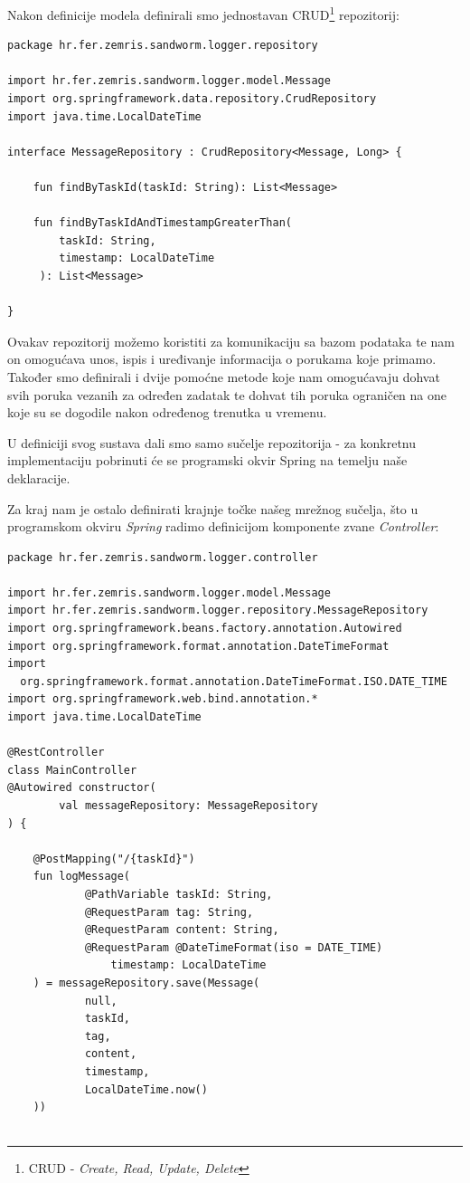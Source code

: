 \documentclass[times, utf8, zavrsni]{fer}
\begin{document}
{Nakon definicije modela definirali smo jednostavan CRUD{\footnote{CRUD - {\textit{Create, Read, Update, Delete}}}} repozitorij:

\begin{lstlisting}
package hr.fer.zemris.sandworm.logger.repository

import hr.fer.zemris.sandworm.logger.model.Message
import org.springframework.data.repository.CrudRepository
import java.time.LocalDateTime

interface MessageRepository : CrudRepository<Message, Long> {

    fun findByTaskId(taskId: String): List<Message>

    fun findByTaskIdAndTimestampGreaterThan(
	 	taskId: String,
		timestamp: LocalDateTime
	 ): List<Message>

}
\end{lstlisting}

Ovakav repozitorij možemo koristiti za komunikaciju sa bazom podataka te nam on omogućava unos, ispis i uređivanje informacija o porukama koje primamo. Također smo definirali i dvije pomoćne metode koje nam omogućavaju dohvat svih poruka vezanih za određen zadatak te dohvat tih poruka ograničen na one koje su se dogodile nakon određenog trenutka u vremenu.

U definiciji svog sustava dali smo samo sučelje repozitorija - za konkretnu implementaciju pobrinuti će se programski okvir Spring na temelju naše deklaracije.

Za kraj nam je ostalo definirati krajnje točke našeg mrežnog sučelja, što u programskom okviru {\textit{Spring}} radimo definicijom komponente zvane {\textit{Controller}}:

\begin{lstlisting}
package hr.fer.zemris.sandworm.logger.controller

import hr.fer.zemris.sandworm.logger.model.Message
import hr.fer.zemris.sandworm.logger.repository.MessageRepository
import org.springframework.beans.factory.annotation.Autowired
import org.springframework.format.annotation.DateTimeFormat
import
  org.springframework.format.annotation.DateTimeFormat.ISO.DATE_TIME
import org.springframework.web.bind.annotation.*
import java.time.LocalDateTime

@RestController
class MainController
@Autowired constructor(
        val messageRepository: MessageRepository
) {

    @PostMapping("/{taskId}")
    fun logMessage(
            @PathVariable taskId: String,
            @RequestParam tag: String,
            @RequestParam content: String,
            @RequestParam @DateTimeFormat(iso = DATE_TIME)
				timestamp: LocalDateTime
    ) = messageRepository.save(Message(
            null,
            taskId,
            tag,
            content,
            timestamp,
            LocalDateTime.now()
    ))


\end{lstlisting}}
\end{document}
